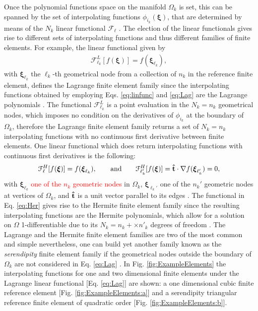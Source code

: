 Once the polynomial functions space on the manifold $\Omega_k$ is set, this can be spanned by the set of interpolating functions $\phi_{i_k}(\boldsymbol{\xi})$, that are determined by means of the $N_k$ linear functional  $\mathcal{F}_\ell$ \cite{larson_finite_2013}.   The election of the  linear functionals gives rise to different sets of interpolating functions and thus different families of finite elements. For example, the linear functional given by
\begin{align}
 \mathcal{F}^{L}_{\ell_k}[f(\boldsymbol{\xi})] = f(\boldsymbol{\xi}_{\ell_k}) ,
\label{eq:Lag}
\end{align}
%
with  $\boldsymbol{\xi}_{\ell_k}$ the $\ell_k$-th  geometrical node from a collection of $n_k$ in the reference finite element, defines the Lagrange finite element family since the  interpolating functions obtained by employing Eqs. \eqref{eq:linfunc} and \eqref{eq:Lag} are the Lagrange polynomials \cite{larson_finite_2013,dhatt_finite_2012,fletcher_computational_1984}. The functional $\mathcal{F}^{L}_{\ell_k}$ is a point evaluation in the $N_k = n_k$  geometrical nodes, which imposes no condition on the derivatives of $\phi_{i_k}$ at the boundary of $\Omega_k$, therefore the Lagrange finite element family returns a set of $N_k = n_k$ interpolating functions with no continuous first derivative between finite elements. One linear functional which does return interpolating functions with continuous first derivatives is the following:
%
%
%
\begin{align}
     \mathcal{F}^{H}_\ell[f(\boldsymbol{\xi})] = f(\boldsymbol{\xi}_{\ell_k}) ,
     \qquad
     \text{and}
     \qquad
     \mathcal{F}^{H}_{\ell_k'}[f(\boldsymbol{\xi})] = \vu{t}\cdot\nabla  f(\boldsymbol{\xi}_{\ell_k'}) = 0,
\label{eq:Her}
\end{align}
%
with $\boldsymbol{\xi}_{\ell_k}$ \textcolor{red}{one of the $n_k$ geometric nodes} in $\Omega_k$, $\boldsymbol{\xi}_{\ell_k'}$ one of the $n_k'$  geometric nodes at vertices of $\Omega_k$, and $\vu{t}$ is a unit vector parallel to its edges \cite{larson_finite_2013}. The functional in Eq. \eqref{eq:Her} gives rise to the Hermite finite element family since the resulting interpolating functions are the Hermite polynomials, which allow for a solution on $\Omega$ 1-differentiable due to its $N_k = n_k + \times n'_k$ degrees of freedom \cite{dhatt_finite_2012,larson_finite_2013}. The Lagrange and the Hermite finite element families are two of the most common and simple nevertheless, one can build yet another family known as the \textit{serendipity} finite element family  if the geometrical nodes outside the boundary of $\Omega_k$ are not considered in Eq. \eqref{eq:Lag} \cite{fletcher_computational_1984}. In Fig. \ref{fig:ExampleElements} the interpolating functions for one and two dimensional finite elements under the Lagrange linear functional [Eq. \eqref{eq:Lag}] are shown:  a one dimensional cubic finite reference element [Fig. \ref{fig:ExampleElements:a}] and a serendipity triangular reference finite element of quadratic order [Fig. \ref{fig:ExampleElements:b}].

